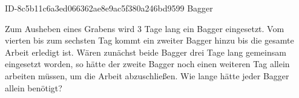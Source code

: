 \begin{exercise}
      {ID-8c5b11c6a3ed066362ae8e9ac5f380a246bd9599}
      {Bagger}
  \ifproblem\problem\par
    Zum Ausheben eines Grabens wird 3 Tage lang ein Bagger eingesetzt. Vom vierten bis
    zum sechsten Tag kommt ein zweiter Bagger hinzu bis die gesamte Arbeit erledigt ist.
    Wären zunächst beide Bagger drei Tage lang gemeinsam eingesetzt worden, so
    hätte der zweite Bagger noch einen weiteren Tag allein arbeiten müssen, um
    die Arbeit abzuschließen. Wie lange hätte jeder Bagger allein benötigt?
  \fi
\end{exercise}
